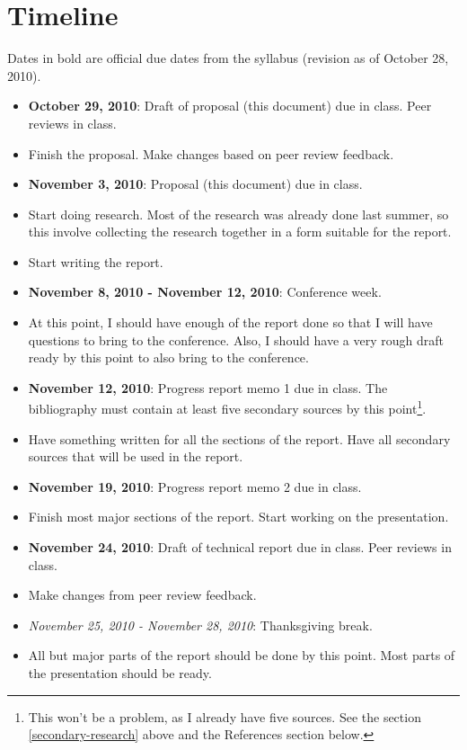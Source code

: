 \documentclass[12pt]{article}
\begin{document}
\section{Timeline}
Dates in bold are official due dates from the syllabus (revision as of
October 28, 2010).

\begin{itemize}
\item \textbf{October 29, 2010}: Draft of proposal (this document) due
in class.  Peer reviews in class.
\item Finish the proposal.  Make changes based on peer review feedback.  
\item \textbf{November 3, 2010}: Proposal (this document) due in class. 
\item Start doing research.  Most of the research was already done last
summer, so this involve collecting the research together in a form
suitable for the report.
\item Start writing the report.  
\item \textbf{November 8, 2010 - November 12, 2010}: Conference week. 
\item At this point, I should have enough of the report done so that I
will have questions to bring to the conference.  Also, I should have a
very rough draft ready by this point to also bring to the conference.
\item \textbf{November 12, 2010}: Progress report memo 1 due in class. 
The bibliography must contain at least five secondary sources by this
point\footnote{This won't be a problem, as I already have five sources. 
See the section \ref{secondary-research} above and the References
section below.}.
\item Have something written for all the sections of the report.  Have
all secondary sources that will be used in the report.
\item \textbf{November 19, 2010}: Progress report memo 2 due in class.
\item Finish most major sections of the report.  Start working on the
presentation.
\item \textbf{November 24, 2010}: Draft of technical report due in
class.  Peer reviews in class.
\item Make changes from peer review feedback.
\item \textit{November 25, 2010 - November 28, 2010}: Thanksgiving break.
\item All but major parts of the report should be done by this point. 
Most parts of the presentation should be ready.

\end{itemize}
\end{document}
